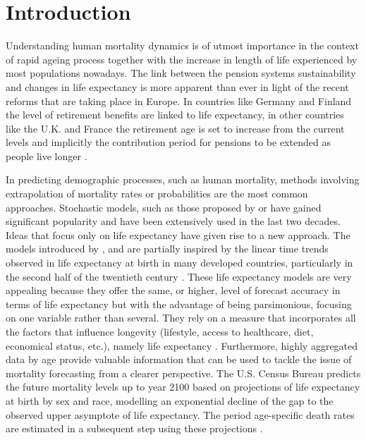 \documentclass[risks,article,submit,moreauthors,pdftex]{Definitions/mdpi}
\begin{document}
\section{Introduction}\label{sec:Intro}

Understanding human mortality dynamics is of utmost importance in the context of rapid ageing process together with the increase in length of life experienced by most populations nowadays. The link between the pension systems sustainability and changes in life expectancy is more apparent than ever in light of the recent reforms that are taking place in Europe. In countries like Germany and Finland the level of retirement benefits are linked to life expectancy, in other countries like the U.K. and France the retirement age is set to increase from the current levels and implicitly the contribution period for pensions to be extended as people live longer \citep{stoeldraijer2013}.

In predicting demographic processes, such as human mortality, methods involving extrapolation of mortality rates or probabilities are the most common approaches. Stochastic models, such as those proposed by \cite{lee1992} or \cite{cairns2006} have gained significant popularity and have been extensively used in the last two decades. Ideas that focus only on life expectancy have given rise to a new approach. The models introduced by \cite{torri2012}, \cite{raftery2014} and \cite{pascariu2018} are partially inspired by the linear time trends observed in life expectancy at birth in many developed countries, particularly in the second half of the twentieth century \citep{oeppen2002, white2002}. These life expectancy models are very appealing because they offer the same, or higher, level of forecast accuracy in terms of life expectancy but with the advantage of being parsimonious, focusing on one variable rather than several. They rely on a measure that incorporates all the factors that influence longevity (lifestyle, access to healthcare, diet, economical status, etc.), namely life expectancy \citep{christensen2009}. Furthermore, highly aggregated data by age provide valuable information that can be used to tackle the issue of mortality forecasting from a clearer perspective. The U.S. Census Bureau predicts the future mortality levels up to year 2100 based on projections of life expectancy at birth by sex and race, modelling an exponential decline of the gap to the observed upper asymptote of life expectancy. The period age-specific death rates are estimated in a subsequent step using these projections \citep{uscensus2014}.
\end{document}
